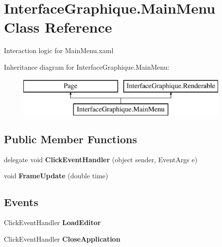 \hypertarget{class_interface_graphique_1_1_main_menu}{}\section{Interface\+Graphique.\+Main\+Menu Class Reference}
\label{class_interface_graphique_1_1_main_menu}


Interaction logic for Main\+Menu.\+xaml  


Inheritance diagram for Interface\+Graphique.\+Main\+Menu\+:\begin{figure}[H]
\begin{center}
\leavevmode
\includegraphics[height=2.000000cm]{class_interface_graphique_1_1_main_menu}
\end{center}
\end{figure}
\subsection*{Public Member Functions}
\begin{DoxyCompactItemize}
\item 
\hypertarget{class_interface_graphique_1_1_main_menu_a5f5f0df5c4abb8f172887e8b307dc32d}{}delegate void {\bfseries Click\+Event\+Handler} (object sender, Event\+Args e)\label{class_interface_graphique_1_1_main_menu_a5f5f0df5c4abb8f172887e8b307dc32d}

\item 
\hypertarget{class_interface_graphique_1_1_main_menu_ae92a15c3a8b243af60860bfe6c0a759e}{}void {\bfseries Frame\+Update} (double time)\label{class_interface_graphique_1_1_main_menu_ae92a15c3a8b243af60860bfe6c0a759e}

\end{DoxyCompactItemize}
\subsection*{Events}
\begin{DoxyCompactItemize}
\item 
\hypertarget{class_interface_graphique_1_1_main_menu_a1fcf5c5928a6c12352f6c3878de70a6e}{}Click\+Event\+Handler {\bfseries Load\+Editor}\label{class_interface_graphique_1_1_main_menu_a1fcf5c5928a6c12352f6c3878de70a6e}

\item 
\hypertarget{class_interface_graphique_1_1_main_menu_a31b655a84417d9e2ad7bb768c56215a2}{}Click\+Event\+Handler {\bfseries Close\+Application}\label{class_interface_graphique_1_1_main_menu_a31b655a84417d9e2ad7bb768c56215a2}

\end{DoxyCompactItemize}


